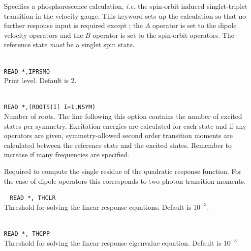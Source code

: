 \begin{description}
\item{}
Specifies a phosphorescence calculation, {\it i.e.\/}
the spin-orbit
induced singlet-triplet transition in the velocity gauge. 
This keyword sets up the calculation so that no further response input is required except ; 
the $A$ operator is set to the dipole velocity operators and
the $B$ operator is set to the spin-orbit
operators. \cite{ovhapjhjajthjojcp97,haovbmaqc27}
The reference state {\em must} be a singlet spin state.

\item{}\\
\verb|READ *,IPRSMO|\\
Print level. Default is 2.

\item{}\\
\verb|READ *,(ROOTS(I) I=1,NSYM)|\\
Number of roots.  The line following this option contains the number
of excited states per symmetry. Excitation
energies are calculated for each state and if
any operators are given,
symmetry-allowed second order transition moments are
calculated between the
reference state and the excited states.
Remember to increase  if many frequencies are specified.

\item{}
Required to
compute the single residue of the quadratic
response function.
For the case of dipole operators this corresponds to two-photon
transition
moments.

\item{}\verb| |\newline
\verb|READ *, THCLR|\\
Threshold for solving the linear response equations.
Default is $10^{-3}$.

\item{}\\
\verb|READ *, THCPP|\\
Threshold for solving the linear response
eigenvalue equation. Default is $10^{-3}$.


\end{description}
